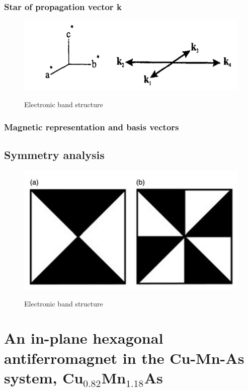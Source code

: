 \documentclass[10pt,doublespacing,edeposit]{uiucthesis2020}
\begin{document}
\begin{mainmatter}
\subsection{Star of propagation vector k}


\begin{figure}
\centering\includegraphics[width=0.7\columnwidth]{figures/ch4/star_of_propagation_vector_k.png} \\
\caption{\label{fig:star}
Electronic band structure
}
\end{figure}

\subsection{Magnetic representation and basis vectors}


\section{Symmetry analysis}


\begin{figure}
\centering\includegraphics[width=0.5\columnwidth]{figures/ch4/symmetry_based_analysis.png} \\
\caption{\label{fig:symmetry_based_analysis}
Electronic band structure
}
\end{figure}



\chapter{An in-plane hexagonal antiferromagnet in the Cu-Mn-As system, Cu$_{0.82}$Mn$_{1.18}$As}


\end{mainmatter}
\end{document}
